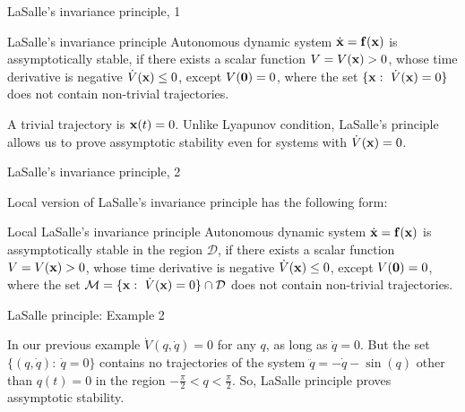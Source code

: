 \documentclass{beamer}
\begin{document}
\begin{frame}{LaSalle's invariance principle, 1}
	\begin{flushleft}
		
		\begin{block}{LaSalle's invariance principle}
			Autonomous dynamic system $\dot{\mathbf{x}} = \mathbf{f}(\mathbf{x})$ is assymptotically stable, if there exists a scalar function $V = V(\mathbf{x}) > 0$, whose time derivative is negative $\dot V(\mathbf{x}) \leq 0$, except $V(\mathbf{0}) = 0$, where the set $\{\mathbf{x}: \   \dot V(\mathbf{x}) = 0  \}$ does not contain non-trivial trajectories.
		\end{block}
	
		\bigskip
		
		A trivial trajectory is $\mathbf{x}(t) = 0$. Unlike Lyapunov condition, LaSalle's principle allows us to prove assymptotic stability even for systems with $\dot V(\mathbf{x}) = 0$.
		
		
	\end{flushleft}
\end{frame}




\begin{frame}{LaSalle's invariance principle, 2}
	\begin{flushleft}
		
		Local version of LaSalle's invariance principle has the following form:
		
		\begin{block}{Local LaSalle's invariance principle}
			Autonomous dynamic system $\dot{\mathbf{x}} = \mathbf{f}(\mathbf{x})$ is assymptotically stable in the region $\mathcal D$, if there exists a scalar function $V = V(\mathbf{x}) > 0$, whose time derivative is negative $\dot V(\mathbf{x}) \leq 0$, except $V(\mathbf{0}) = 0$, where the set $\mathcal M = \{\mathbf{x}: \   \dot V(\mathbf{x}) = 0  \} \cap \mathcal D$ does not contain non-trivial trajectories.
		\end{block}
		
		
	\end{flushleft}
\end{frame}



\begin{frame}{LaSalle principle: Example 2}
	\begin{flushleft}
		
			In our previous example $\dot V(q, \dot{q}) = 0$ for any $q$, as long as $\dot{q} = 0$. But the set $\{(q, \dot{q}): \   \dot{q} = 0 \}$ contains no trajectories of the system $\ddot{q}  = -\dot{q} - \sin(q)$ other than $q(t) = 0$ in the region $-\frac{\pi}{2} < q < \frac{\pi}{2}$. So, LaSalle principle proves assymptotic stability.
		
	\end{flushleft}
\end{frame}
\end{document}
